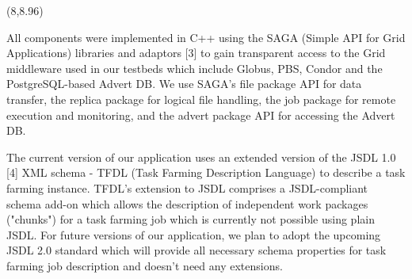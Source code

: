 \documentclass[a0b,portrait]{a0poster}
\def\LHead#1{\bigskip\bigskip\noindent{\huge\color{HeadColor} #1}\smallskip}
\begin{document}
\begin{textblock}{7}(8,8.96)

\color{Black}\large 

All components were implemented in C++ using the SAGA (Simple API for Grid
Applications) libraries and adaptors [3] to gain transparent access to the Grid
middleware used in our testbeds which include Globus, PBS, Condor and the 
PostgreSQL-based Advert DB. We use SAGA's file package API for data transfer, 
the replica package for logical file handling, the job package for remote 
execution and monitoring, and the advert package API for accessing the Advert
DB.\\[-1.4em]

\LHead{Job Description}

The current version of our application uses an extended version of the JSDL 1.0 [4]
XML schema - TFDL (Task Farming Description Language) to describe a task farming 
instance. TFDL's extension to JSDL comprises a JSDL-compliant schema add-on which
allows the description of independent work packages ("chunks") for a task farming 
job which is currently not possible using plain JSDL.
For future versions of our application, we plan to adopt the upcoming JSDL 2.0 
standard which will provide all necessary schema properties for task farming job
description and doesn't need any extensions.

\LHead{Results}


\end{textblock}
\end{document}
